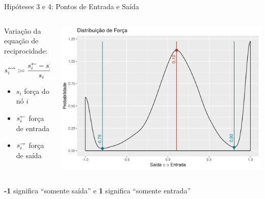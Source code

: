 \documentclass[10pt, hyperref={pdfpagelabels=false}]{beamer}
\begin{document}
{
\begin{frame}[c, label=hipotese-pontos-entrada-e-saida]{Hipóteses 3 e 4: Pontos de Entrada e Saída}
  \begin{center}
    \begin{columns}[onlytextwidth]
      \begin{column}{0.5\textwidth}
        Variação da equação de reciprocidade:
        
        \begin{equation*}
          s_i^\leftrightsquigarrow \coloneqq \frac{s_i^\leftarrow - s_i^\rightarrow}{s_i}
        \end{equation*}
        
        \begin{itemize}
          \item[] $s_i$ força do nó $i$
          \item[] $s_i^\leftarrow$ força de entrada
          \item[] $s_i^\rightarrow$ força de saída
        \end{itemize}
      \end{column}
    
      \begin{column}{0.5\textwidth}
        \includegraphics[width=\textwidth]{distribuicao-de-forca}
      \end{column}
    \end{columns}
  
    \vspace{\baselineskip}
  
    \textbf{-1} significa \enquote{somente saída} e \textbf{1} significa \enquote{somente entrada}
  \end{center}
\end{frame}
}
\end{document}

